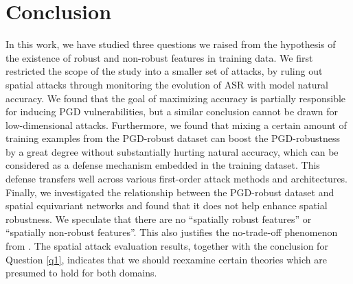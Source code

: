 \section{Conclusion}
In this work, we have studied three questions we raised from the hypothesis of the existence of robust and non-robust features in training data. We first restricted the scope of the study into a smaller set of attacks, by ruling out spatial attacks through monitoring the evolution of ASR with model natural accuracy. We found that the goal of maximizing accuracy is partially responsible for inducing PGD vulnerabilities, but a similar conclusion cannot be drawn for low-dimensional attacks. Furthermore, we found that mixing a certain amount of training examples from the PGD-robust dataset can boost the PGD-robustness by a great degree without substantially hurting natural accuracy, which can be considered as a defense mechanism embedded in the training dataset. This defense transfers well across various first-order attack methods and architectures. Finally, we investigated the relationship between the PGD-robust dataset and spatial equivariant networks and found that it does not help enhance spatial robustness. We speculate that there are no ``spatially robust features'' or ``spatially non-robust features''. This also justifies the no-trade-off phenomenon from \cite{Yang2019}. The spatial attack evaluation results, together with the conclusion for Question \ref{q1}, indicates that we should reexamine certain theories which are presumed to hold for both domains.